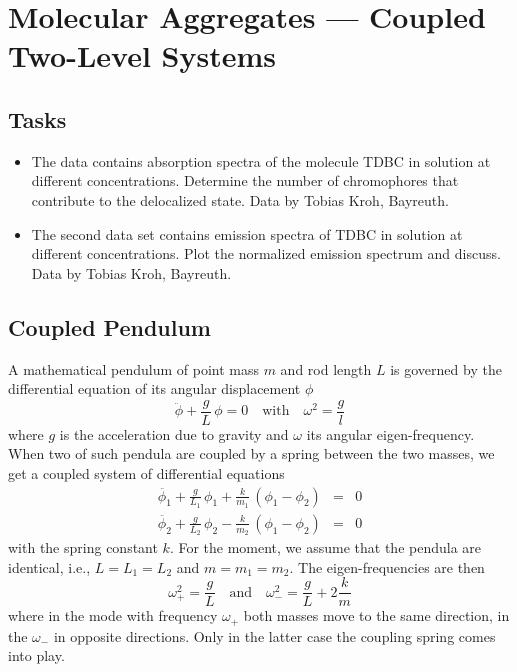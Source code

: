 \renewcommand{\lastmod}{April 27, 2020}


\chapter{Molecular Aggregates --- Coupled Two-Level Systems}



\section{Tasks}

\begin{itemize}
\item The data contains absorption spectra of the molecule TDBC in solution at different concentrations. Determine the number of chromophores that contribute to the delocalized state. Data by Tobias Kroh, Bayreuth.

\item The second data set contains emission spectra of TDBC in solution at different concentrations. Plot the normalized emission spectrum and discuss. Data by Tobias Kroh, Bayreuth.
\end{itemize}






\section{Coupled Pendulum}

A mathematical pendulum of point mass $m$ and rod length $L$ is governed by the differential equation of its angular displacement $\phi$
\begin{equation}
 \ddot{\phi} + \frac{g}{L} \, \phi = 0 \quad \text{with} \quad \omega^2 = \frac{g}{l}
\end{equation}
where $g$ is the acceleration due to gravity and $\omega$ its angular eigen-frequency. When two of such pendula are coupled by a spring between the two masses, we get a coupled system of differential equations
\begin{eqnarray}
 \ddot{\phi_1} + \frac{g}{L_1} \, \phi_1  + \frac{k}{m_1} \, \left( \phi_1  - \phi_2 \right)  & = &  0  \\
 \ddot{\phi_2} + \frac{g}{L_2} \, \phi_2  - \frac{k}{m_2} \, \left( \phi_1  - \phi_2 \right)  & = &  0  
\end{eqnarray}
with the spring constant $k$.  For the moment, we assume that the pendula are identical, i.e., $L = L_1 = L_2$ and $m = m_1 =m_2$. The eigen-frequencies are then
\begin{equation}
 \omega_{+}^2 = \frac{g}{L} \quad \text{and} \quad 
  \omega_{-}^2 = \frac{g}{L}  + 2 \frac{k}{m}
\end{equation}
where in the mode with frequency $\omega_{+}$ both masses move to the same direction, in the $\omega_{-}$ in opposite directions. Only in the latter case the coupling spring comes into play.

